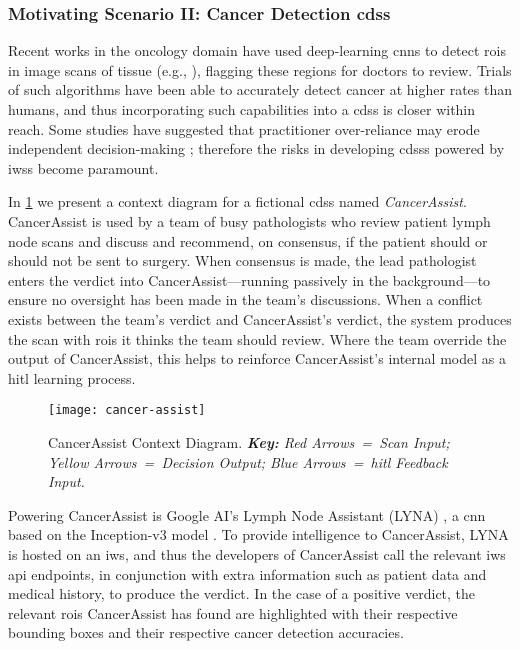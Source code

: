 
\subsubsection{Motivating Scenario II: Cancer Detection \gls{cdss}}
\label{ssec:introduction:motivation:scenario:cancer}

Recent works in the oncology domain have used deep-learning \glspl{cnn} to detect \glspl{roi} in image scans of tissue (e.g., \citep{Liu:2018fa,Haenssle:2018bz,EhteshamiBejnordi:2017kq}), flagging these regions for doctors to review. Trials of such algorithms have been able to accurately detect cancer at higher rates than humans, and thus incorporating such capabilities into a \gls{cdss} is closer within reach. Some studies have suggested that practitioner over-reliance may erode independent decision-making \citep{Jaspers:2011hy,Chambers:1991uh}; therefore the risks in developing \glspl{cdss} powered by \glspl{iws} become paramount.

In \cref{fig:introduction:motivation:scenario:cancer} we present a context diagram for a fictional \gls{cdss} named \textit{CancerAssist}. CancerAssist is used by a team of busy pathologists who review patient lymph node scans and discuss and recommend, on consensus, if the patient should or should not be sent to surgery. When consensus is made, the lead pathologist enters the verdict into CancerAssist---running passively in the background---to ensure no oversight has been made in the team's discussions. When a conflict exists between the team's verdict and CancerAssist's verdict, the system produces the scan with \glspl{roi} it thinks the team should review. Where the team override the output of CancerAssist, this helps to reinforce CancerAssist's internal model as a \gls{hitl} learning process.

\begin{figure}[th]
\centering
  \texttt{[image: cancer-assist]}
  \caption[CancerAssist Context Diagram]{CancerAssist Context Diagram. \textit{\textbf{Key:} Red Arrows~=~Scan Input; Yellow Arrows~=~Decision Output; Blue Arrows~=~\gls{hitl} Feedback Input.}}
  \label{fig:introduction:motivation:scenario:cancer}
\end{figure}

Powering CancerAssist is Google AI's Lymph Node Assistant (LYNA) \citep{Liu:2018fa}, a \gls{cnn} based on the Inception-v3 model \citep{Szegedy:2016ws,Krizhevsky:2012wl}. To provide intelligence to CancerAssist, LYNA is hosted on an \gls{iws}, and thus the developers of CancerAssist call the relevant \gls{iws} \gls{api} endpoints, in conjunction with extra information such as patient data and medical history, to produce the verdict. In the case of a positive verdict, the relevant \glspl{roi} CancerAssist has found are highlighted with their respective bounding boxes and their respective cancer detection accuracies.

